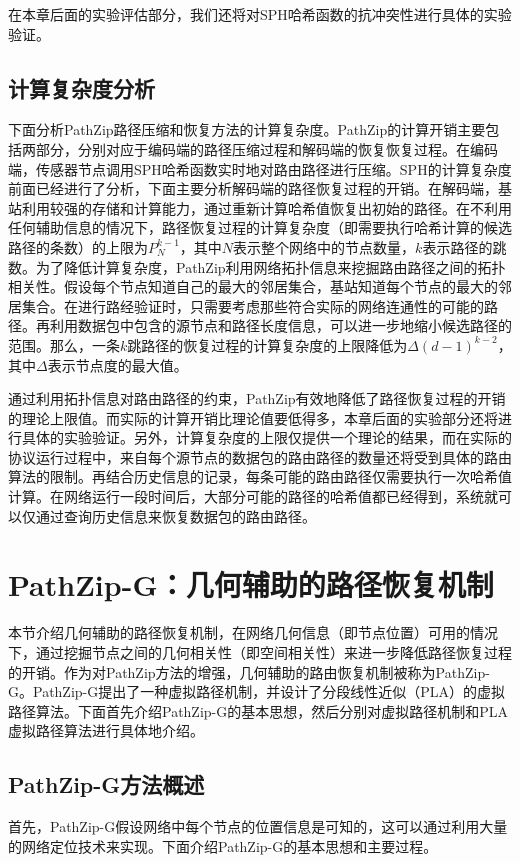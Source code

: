 在本章后面的实验评估部分，我们还将对SPH哈希函数的抗冲突性进行具体的实验验证。
\subsection{计算复杂度分析}
下面分析PathZip路径压缩和恢复方法的计算复杂度。PathZip的计算开销主要包括两部分，分别对应于编码端的路径压缩过程和解码端的恢复恢复过程。在编码端，传感器节点调用SPH哈希函数实时地对路由路径进行压缩。SPH的计算复杂度前面已经进行了分析，下面主要分析解码端的路径恢复过程的开销。在解码端，基站利用较强的存储和计算能力，通过重新计算哈希值恢复出初始的路径。在不利用任何辅助信息的情况下，路径恢复过程的计算复杂度（即需要执行哈希计算的候选路径的条数）的上限为$P_N^{k-1}$，其中$N$表示整个网络中的节点数量，$k$表示路径的跳数。为了降低计算复杂度，PathZip利用网络拓扑信息来挖掘路由路径之间的拓扑相关性。假设每个节点知道自己的最大的邻居集合，基站知道每个节点的最大的邻居集合。在进行路经验证时，只需要考虑那些符合实际的网络连通性的可能的路径。再利用数据包中包含的源节点和路径长度信息，可以进一步地缩小候选路径的范围。那么，一条$k$跳路径的恢复过程的计算复杂度的上限降低为$\Delta(d-1)^{k-2}$，其中$\Delta$表示节点度的最大值。

通过利用拓扑信息对路由路径的约束，PathZip有效地降低了路径恢复过程的开销的理论上限值。而实际的计算开销比理论值要低得多，本章后面的实验部分还将进行具体的实验验证。另外，计算复杂度的上限仅提供一个理论的结果，而在实际的协议运行过程中，来自每个源节点的数据包的路由路径的数量还将受到具体的路由算法的限制。再结合历史信息的记录，每条可能的路由路径仅需要执行一次哈希值计算。在网络运行一段时间后，大部分可能的路径的哈希值都已经得到，系统就可以仅通过查询历史信息来恢复数据包的路由路径。
\section{PathZip-G：几何辅助的路径恢复机制}
本节介绍几何辅助的路径恢复机制，在网络几何信息（即节点位置）可用的情况下，通过挖掘节点之间的几何相关性（即空间相关性）来进一步降低路径恢复过程的开销。作为对PathZip方法的增强，几何辅助的路由恢复机制被称为PathZip-G。PathZip-G提出了一种虚拟路径机制，并设计了分段线性近似（PLA）的虚拟路径算法。下面首先介绍PathZip-G的基本思想，然后分别对虚拟路径机制和PLA虚拟路径算法进行具体地介绍。
\subsection{PathZip-G方法概述}
首先，PathZip-G假设网络中每个节点的位置信息是可知的，这可以通过利用大量的网络定位技术来实现。下面介绍PathZip-G的基本思想和主要过程。

